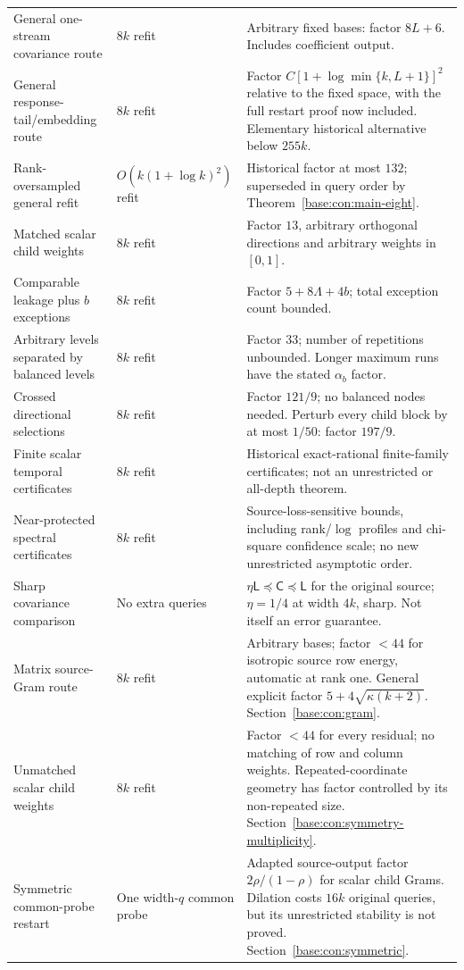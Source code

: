 \documentclass[11pt,oneside,openany,a4paper]{book}
\numberwithin{equation}{chapter}
\theoremstyle{definition}
\theoremstyle{remark}
\newcommand{\Cov}{\mathsf C}\newcommand{\Loss}{\mathsf L}\newcommand{\Fil}{\mathcal F}
\begin{document}
\begin{longtable}{@{}>{\RaggedRight\arraybackslash}p{.29\linewidth}>{\RaggedRight\arraybackslash}p{.18\linewidth}>{\RaggedRight\arraybackslash}p{.46\linewidth}@{}}
General one-stream covariance route&$8k$ refit&Arbitrary fixed bases: factor $8L+6$. Includes coefficient output.\\
General response-tail/embedding route&$8k$ refit&Factor $C[1+\log\min\{k,L+1\}]^2$ relative to the fixed space, with the full restart proof now included. Elementary historical alternative below $255k$.\\
Rank-oversampled general refit&$O(k(1+\log k)^2)$ refit&Historical factor at most $132$; superseded in query order by Theorem~\ref{base:con:main-eight}.\\
Matched scalar child weights&$8k$ refit&Factor $13$, arbitrary orthogonal directions and arbitrary weights in $[0,1]$.\\
Comparable leakage plus $b$ exceptions&$8k$ refit&Factor $5+8\Lambda+4b$; total exception count bounded.\\
Arbitrary levels separated by balanced levels&$8k$ refit&Factor $33$; number of repetitions unbounded. Longer maximum runs have the stated $\alpha_b$ factor.\\
Crossed directional selections&$8k$ refit&Factor $121/9$; no balanced nodes needed. Perturb every child block by at most $1/50$: factor $197/9$.\\
Finite scalar temporal certificates&$8k$ refit&Historical exact-rational finite-family certificates; not an unrestricted or all-depth theorem.\\
Near-protected spectral certificates&$8k$ refit&Source-loss-sensitive bounds, including rank/$\log$ profiles and chi-square confidence scale; no new unrestricted asymptotic order.\\
Sharp covariance comparison&No extra queries&$\eta\Loss\preceq\Cov\preceq\Loss$ for the original source; $\eta=1/4$ at width $4k$, sharp. Not itself an error guarantee.\\
Matrix source-Gram route&$8k$ refit&Arbitrary bases; factor $<44$ for isotropic source row energy, automatic at rank one. General explicit factor $5+4\sqrt{\kappa(k+2)}$. Section~\ref{base:con:gram}.\\
Unmatched scalar child weights&$8k$ refit&Factor $<44$ for every residual; no matching of row and column weights. Repeated-coordinate geometry has factor controlled by its non-repeated size. Section~\ref{base:con:symmetry-multiplicity}.\\
Symmetric common-probe restart&One width-$q$ common probe&Adapted source-output factor $2\rho/(1-\rho)$ for scalar child Grams. Dilation costs $16k$ original queries, but its unrestricted stability is not proved. Section~\ref{base:con:symmetric}.\\

\end{longtable}
\end{document}
